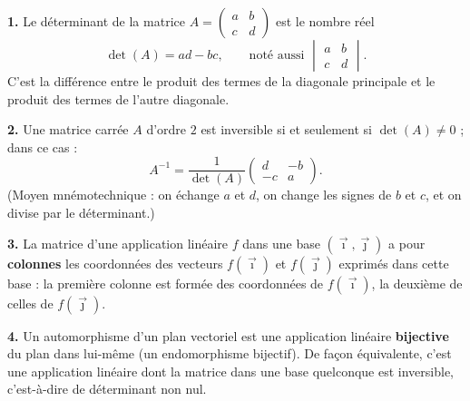 \documentclass[11pt]{article}
\newcommand{\cle}[1]{{\popxbold\color{popdark}#1}}
\begin{document}
\begin{corrige}
\textbf{1.} Le \cle{déterminant} de la matrice $A = \begin{pmatrix} a & b \\ c & d \end{pmatrix}$ est le nombre réel
\[ \det(A) = ad - bc, \qquad \text{noté aussi } \begin{vmatrix} a & b \\ c & d \end{vmatrix}. \]
C'est la différence entre le produit des termes de la diagonale principale et le produit des termes de l'autre diagonale.

\textbf{2.} Une matrice carrée $A$ d'ordre $2$ est inversible si et seulement si $\det(A) \neq 0$ ; dans ce cas :
\[ A^{-1} = \frac{1}{\det(A)}\begin{pmatrix} d & -b \\ -c & a \end{pmatrix}. \]
(Moyen mnémotechnique : on échange $a$ et $d$, on change les signes de $b$ et $c$, et on divise par le déterminant.)

\textbf{3.} La matrice d'une application linéaire $f$ dans une base $(\vec{\imath}, \vec{\jmath})$ a pour \textbf{colonnes} les coordonnées des vecteurs $f(\vec{\imath})$ et $f(\vec{\jmath})$ exprimés dans cette base : la première colonne est formée des coordonnées de $f(\vec{\imath})$, la deuxième de celles de $f(\vec{\jmath})$.

\textbf{4.} Un \cle{automorphisme} d'un plan vectoriel est une application linéaire \textbf{bijective} du plan dans lui-même (un endomorphisme bijectif). De façon équivalente, c'est une application linéaire dont la matrice dans une base quelconque est inversible, c'est-à-dire de déterminant non nul.
\end{corrige}
\end{document}
